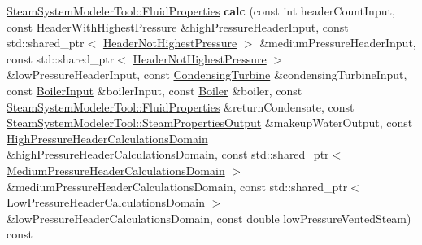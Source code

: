 \begin{DoxyCompactItemize}
\mbox{\label{class_makeup_water_mass_flow_calculator_a66bad96c1e50b0d45a5f67bc21d87662}} 
\hyperlink{struct_steam_system_modeler_tool_1_1_fluid_properties}{Steam\+System\+Modeler\+Tool\+::\+Fluid\+Properties} {\bfseries calc} (const int header\+Count\+Input, const \hyperlink{class_header_with_highest_pressure}{Header\+With\+Highest\+Pressure} \&high\+Pressure\+Header\+Input, const std\+::shared\+\_\+ptr$<$ \hyperlink{class_header_not_highest_pressure}{Header\+Not\+Highest\+Pressure} $>$ \&medium\+Pressure\+Header\+Input, const std\+::shared\+\_\+ptr$<$ \hyperlink{class_header_not_highest_pressure}{Header\+Not\+Highest\+Pressure} $>$ \&low\+Pressure\+Header\+Input, const \hyperlink{class_condensing_turbine}{Condensing\+Turbine} \&condensing\+Turbine\+Input, const \hyperlink{class_boiler_input}{Boiler\+Input} \&boiler\+Input, const \hyperlink{class_boiler}{Boiler} \&boiler, const \hyperlink{struct_steam_system_modeler_tool_1_1_fluid_properties}{Steam\+System\+Modeler\+Tool\+::\+Fluid\+Properties} \&return\+Condensate, const \hyperlink{struct_steam_system_modeler_tool_1_1_steam_properties_output}{Steam\+System\+Modeler\+Tool\+::\+Steam\+Properties\+Output} \&makeup\+Water\+Output, const \hyperlink{class_high_pressure_header_calculations_domain}{High\+Pressure\+Header\+Calculations\+Domain} \&high\+Pressure\+Header\+Calculations\+Domain, const std\+::shared\+\_\+ptr$<$ \hyperlink{class_medium_pressure_header_calculations_domain}{Medium\+Pressure\+Header\+Calculations\+Domain} $>$ \&medium\+Pressure\+Header\+Calculations\+Domain, const std\+::shared\+\_\+ptr$<$ \hyperlink{class_low_pressure_header_calculations_domain}{Low\+Pressure\+Header\+Calculations\+Domain} $>$ \&low\+Pressure\+Header\+Calculations\+Domain, const double low\+Pressure\+Vented\+Steam) const
\item 
\mbox{\label{class_makeup_water_mass_flow_calculator_a66bad96c1e50b0d45a5f67bc21d87662}} 

\end{DoxyCompactItemize}

